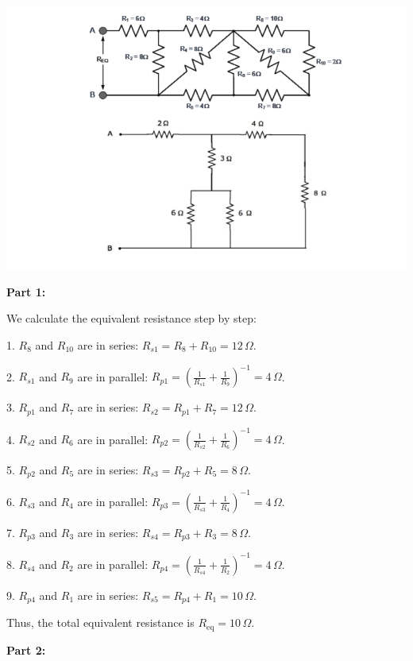 \documentclass{article}
\begin{document}
\begin{center}

        \includegraphics[width=0.75\linewidth]{figures/image.png}
\end{center}

\textbf{Part 1:}

We calculate the equivalent resistance step by step:

1. \( R_8 \) and \( R_{10} \) are in series:  
   \( R_{s1} = R_8 + R_{10} = 12 \, \Omega \).

2. \( R_{s1} \) and \( R_9 \) are in parallel:  
   \( R_{p1} = \left( \frac{1}{R_{s1}} + \frac{1}{R_9} \right)^{-1} = 4 \, \Omega \).

3. \( R_{p1} \) and \( R_7 \) are in series:  
   \( R_{s2} = R_{p1} + R_7 = 12 \, \Omega \).

4. \( R_{s2} \) and \( R_6 \) are in parallel:  
   \( R_{p2} = \left( \frac{1}{R_{s2}} + \frac{1}{R_6} \right)^{-1} = 4 \, \Omega \).

5. \( R_{p2} \) and \( R_5 \) are in series:  
   \( R_{s3} = R_{p2} + R_5 = 8 \, \Omega \).

6. \( R_{s3} \) and \( R_4 \) are in parallel:  
   \( R_{p3} = \left( \frac{1}{R_{s3}} + \frac{1}{R_4} \right)^{-1} = 4 \, \Omega \).

7. \( R_{p3} \) and \( R_3 \) are in series:  
   \( R_{s4} = R_{p3} + R_3 = 8 \, \Omega \).

8. \( R_{s4} \) and \( R_2 \) are in parallel:  
   \( R_{p4} = \left( \frac{1}{R_{s4}} + \frac{1}{R_2} \right)^{-1} = 4 \, \Omega \).

9. \( R_{p4} \) and \( R_1 \) are in series:  
   \( R_{s5} = R_{p4} + R_1 = 10 \, \Omega \).

Thus, the total equivalent resistance is \( R_{\text{eq}} = 10 \, \Omega \).

\bigskip

\textbf{Part 2:}
\end{document}

